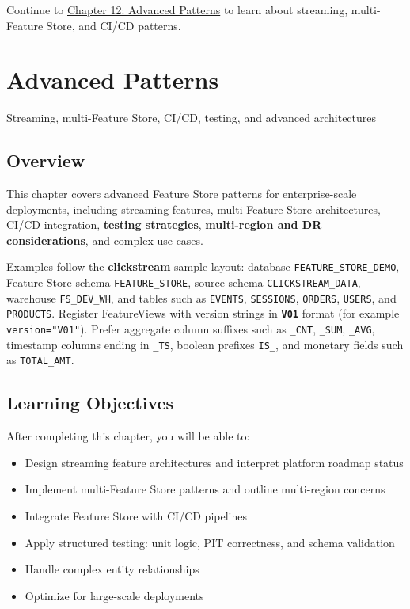 \documentclass[
  letterpaper,
  DIV=11,
  numbers=noendperiod]{scrreprt}
\providecommand{\tightlist}{%
  \setlength{\itemsep}{0pt}\setlength{\parskip}{0pt}}\usepackage{longtable,booktabs,array}
\begin{document}
Continue to \protect\hyperlink{advanced-patterns}{Chapter 12: Advanced
Patterns} to learn about streaming, multi-Feature Store, and CI/CD
patterns.

\hypertarget{advanced-patterns}{%
\chapter{Advanced Patterns}\label{advanced-patterns}}

Streaming, multi-Feature Store, CI/CD, testing, and advanced
architectures

\hfill\break

\hypertarget{overview-12}{%
\section{Overview}\label{overview-12}}

This chapter covers advanced Feature Store patterns for enterprise-scale
deployments, including streaming features, multi-Feature Store
architectures, CI/CD integration, \textbf{testing strategies},
\textbf{multi-region and DR considerations}, and complex use cases.

Examples follow the \textbf{clickstream} sample layout: database
\texttt{FEATURE\_STORE\_DEMO}, Feature Store schema
\texttt{FEATURE\_STORE}, source schema \texttt{CLICKSTREAM\_DATA},
warehouse \texttt{FS\_DEV\_WH}, and tables such as \texttt{EVENTS},
\texttt{SESSIONS}, \texttt{ORDERS}, \texttt{USERS}, and
\texttt{PRODUCTS}. Register FeatureViews with version strings in
\textbf{\texttt{V01}} format (for example \texttt{version="V01"}).
Prefer aggregate column suffixes such as \texttt{\_CNT}, \texttt{\_SUM},
\texttt{\_AVG}, timestamp columns ending in \texttt{\_TS}, boolean
prefixes \texttt{IS\_}, and monetary fields such as \texttt{TOTAL\_AMT}.

\hypertarget{learning-objectives-11}{%
\section{Learning Objectives}\label{learning-objectives-11}}

After completing this chapter, you will be able to:

\begin{itemize}
\tightlist
\item
  Design streaming feature architectures and interpret platform roadmap
  status
\item
  Implement multi-Feature Store patterns and outline multi-region
  concerns
\item
  Integrate Feature Store with CI/CD pipelines
\item
  Apply structured testing: unit logic, PIT correctness, and schema
  validation
\item
  Handle complex entity relationships
\item
  Optimize for large-scale deployments
\end{itemize}
\end{document}
